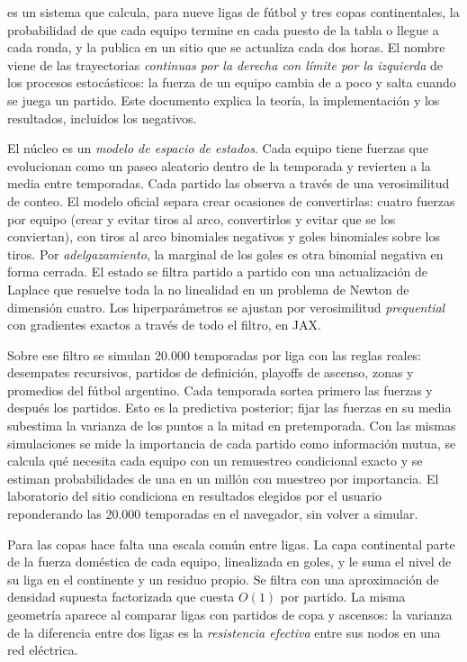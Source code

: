 \vspace*{-0.6cm}
\cadlag es un sistema que calcula, para nueve ligas de fútbol y tres copas continentales, la probabilidad de que cada equipo termine en cada puesto de la tabla o llegue a cada ronda, y la publica en un sitio que se actualiza cada dos horas. El nombre viene de las trayectorias \emph{continuas por la derecha con límite por la izquierda} de los procesos estocásticos: la fuerza de un equipo cambia de a poco y salta cuando se juega un partido. Este documento explica la teoría, la implementación y los resultados, incluidos los negativos.

El núcleo es un \emph{modelo de espacio de estados}. Cada equipo tiene fuerzas que evolucionan como un paseo aleatorio dentro de la temporada y revierten a la media entre temporadas. Cada partido las observa a través de una verosimilitud de conteo. El modelo oficial separa crear ocasiones de convertirlas: cuatro fuerzas por equipo (crear y evitar tiros al arco, convertirlos y evitar que se los conviertan), con tiros al arco binomiales negativos y goles binomiales sobre los tiros. Por \emph{adelgazamiento}, la marginal de los goles es otra binomial negativa en forma cerrada. El estado se filtra partido a partido con una actualización de Laplace que resuelve toda la no linealidad en un problema de Newton de dimensión cuatro. Los hiperparámetros se ajustan por verosimilitud \emph{prequential} con gradientes exactos a través de todo el filtro, en JAX.

Sobre ese filtro se simulan 20.000 temporadas por liga con las reglas reales: desempates recursivos, partidos de definición, playoffs de ascenso, zonas y promedios del fútbol argentino. Cada temporada sortea primero las fuerzas y después los partidos. Esto es la predictiva posterior; fijar las fuerzas en su media subestima la varianza de los puntos a la mitad en pretemporada. Con las mismas simulaciones se mide la importancia de cada partido como información mutua, se calcula qué necesita cada equipo con un remuestreo condicional exacto y se estiman probabilidades de una en un millón con muestreo por importancia. El laboratorio del sitio condiciona en resultados elegidos por el usuario reponderando las 20.000 temporadas en el navegador, sin volver a simular.

Para las copas hace falta una escala común entre ligas. La capa continental parte de la fuerza doméstica de cada equipo, linealizada en goles, y le suma el nivel de su liga en el continente y un residuo propio. Se filtra con una aproximación de densidad supuesta factorizada que cuesta $O(1)$ por partido. La misma geometría aparece al comparar ligas con partidos de copa y ascensos: la varianza de la diferencia entre dos ligas es la \emph{resistencia efectiva} entre sus nodos en una red eléctrica.

